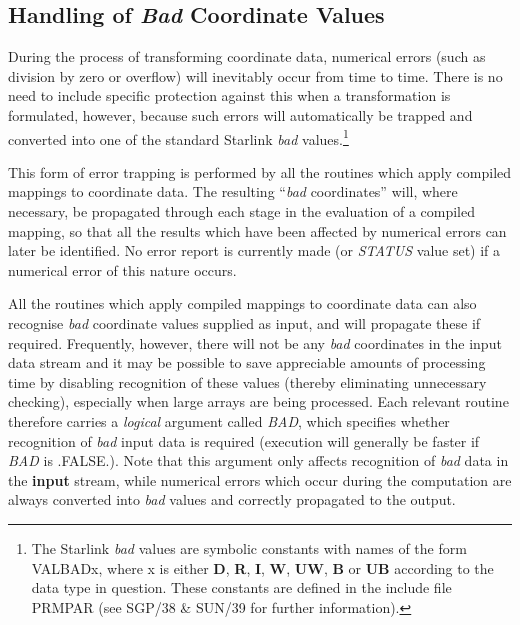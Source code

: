 \documentclass[twoside,11pt]{article}
\newcommand{\xref}[3]{#1}
\newcommand{\xlabel}[1]{}
\renewcommand{\_}{\texttt{\symbol{95}}}
\newcommand{\name}[1]{\mbox{\small{#1}}}
\newcommand{\fortvar}[1]{\mbox{\emph{#1}}}
\begin{document}
\subsection{\xlabel{handling_of_bad_coordinate_values}Handling of \emph{Bad} Coordinate Values}

\label{section:additional:badvalues}

During the process of transforming coordinate data, numerical errors (such
as division by zero or overflow) will inevitably occur from time to time.
There is no need to include specific protection against this when a
transformation is formulated, however, because such errors will
automatically be trapped and converted into one of the standard Starlink
{\em bad} values.\footnote{
The Starlink \emph{bad} values are symbolic constants with names of the form
\name{VAL\_\_BADx}, where x is either \textbf{D}, \textbf{R}, \textbf{I},
\textbf{W}, \textbf{UW}, \textbf{B} or \textbf{UB} according to the data
type in question.
These constants are defined in the include file \name{PRM\_PAR} (see
\xref{SGP/38}{sgp38}{}
\& \xref{SUN/39}{sun39}{} for further information).}

This form of error trapping is performed by all the routines which apply
compiled mappings to coordinate data.
The resulting ``\emph{bad} coordinates'' will, where necessary, be propagated
through each stage in the evaluation of a compiled mapping, so that all the
results which have been affected by numerical errors can later be
identified.
No error report is currently made (or \fortvar{STATUS} value set) if a
numerical error of this nature occurs.

All the routines which apply compiled mappings to coordinate data can also
recognise \emph{bad} coordinate values supplied as input, and will propagate
these if required.
Frequently, however, there will not be any \emph{bad} coordinates in the
input data stream and it may be possible to save appreciable amounts of
processing time by disabling recognition of these values (thereby
eliminating unnecessary checking), especially when large arrays are being
processed.
Each relevant routine therefore carries a \emph{logical} argument called
\fortvar{BAD}, which specifies whether recognition of \emph{bad} input data
is required (execution will generally be faster if \fortvar{BAD} is
\name{.FALSE.}).
Note that this argument only affects recognition of \emph{bad} data in the
\textbf{input} stream, while numerical errors which occur during the
computation are always converted into \emph{bad} values and correctly
propagated to the output.
\end{document}
